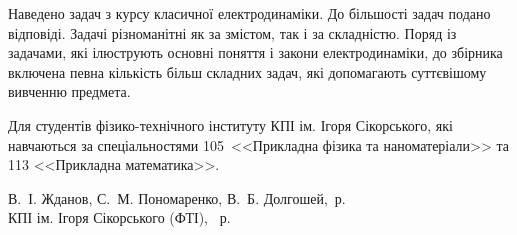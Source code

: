 {\begin{alwayssingle}
		Наведено  задач з курсу класичної електродинаміки. До більшості задач подано відповіді. Задачі різноманітні як за змістом, так і за складністю. Поряд із задачами, які ілюструють основні поняття і закони електродинаміки, до збірника включена певна кількість більш складних задач, які допомагають суттєвішому вивченню предмета.

		Для студентів фізико-технічного інституту КПІ ім. Ігоря Сікорського, які навчаються за спеціальностями 105~<<Прикладна фізика та наноматеріали>> та 113 <<Прикладна математика>>.
		
		\vfill
				
	\hfill
	\begin{minipage}[t]{0.65\linewidth}\small
        \textcopyright{} В.~І. Жданов, С.~М. Пономаренко, В.~Б. Долгошей, \the\year\,р. \\
        \textcopyright{}  КПІ ім. Ігоря Сікорського (ФТІ), \the\year~р.
    \end{minipage}
		\newpage%
	\end{alwayssingle}
}

